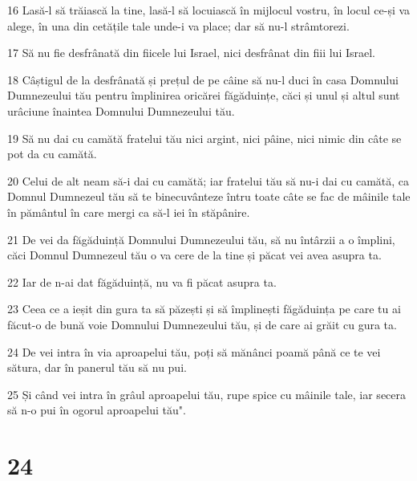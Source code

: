 \par 16 Lasă-l să trăiască la tine, lasă-l să locuiască în mijlocul vostru, în locul ce-și va alege, în una din cetățile tale unde-i va place; dar să nu-l strâmtorezi.
\par 17 Să nu fie desfrânată din fiicele lui Israel, nici desfrânat din fiii lui Israel.
\par 18 Câștigul de la desfrânată și prețul de pe câine să nu-l duci în casa Domnului Dumnezeului tău pentru împlinirea oricărei făgăduințe, căci și unul și altul sunt urâciune înaintea Domnului Dumnezeului tău.
\par 19 Să nu dai cu camătă fratelui tău nici argint, nici pâine, nici nimic din câte se pot da cu camătă.
\par 20 Celui de alt neam să-i dai cu camătă; iar fratelui tău să nu-i dai cu camătă, ca Domnul Dumnezeul tău să te binecuvânteze întru toate câte se fac de mâinile tale în pământul în care mergi ca să-l iei în stăpânire.
\par 21 De vei da făgăduință Domnului Dumnezeului tău, să nu întârzii a o împlini, căci Domnul Dumnezeul tău o va cere de la tine și păcat vei avea asupra ta.
\par 22 Iar de n-ai dat făgăduință, nu va fi păcat asupra ta.
\par 23 Ceea ce a ieșit din gura ta să păzești și să împlinești făgăduința pe care tu ai făcut-o de bună voie Domnului Dumnezeului tău, și de care ai grăit cu gura ta.
\par 24 De vei intra în via aproapelui tău, poți să mănânci poamă până ce te vei sătura, dar în panerul tău să nu pui.
\par 25 Și când vei intra în grâul aproapelui tău, rupe spice cu mâinile tale, iar secera să n-o pui în ogorul aproapelui tău".

\chapter{24}

